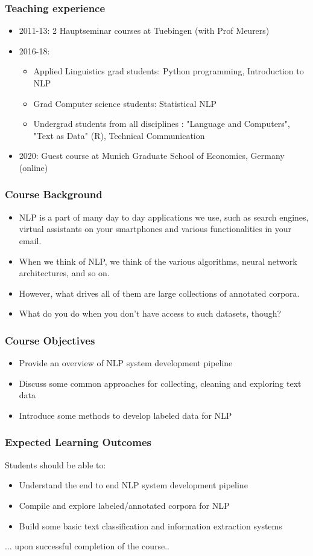 \documentclass{beamer}
\begin{document}
\begin{frame}
\frametitle{Teaching experience}
\begin{itemize}
\item 2011-13: 2 Hauptseminar courses at Tuebingen (with Prof Meurers)
\item 2016-18:
\begin{itemize}
\item Applied Linguistics grad students: Python programming, Introduction to NLP
\item Grad Computer science students: Statistical NLP
\item Undergrad students from all disciplines : "Language and Computers", "Text as Data" (R), Technical Communication 
\end{itemize}
\item 2020: Guest course at Munich Graduate School of Economics, Germany (online)
\end{itemize}
\end{frame}

\begin{frame}
\frametitle{Course Background}
\begin{itemize}
\item NLP is a part of many day to day applications we use, such as search engines, virtual assistants on your smartphones and various functionalities in your email.
\pause \item When we think of NLP, we think of the various algorithms, neural network architectures, and so on. \pause
\item However, what drives all of them are large collections of annotated corpora. \pause
\item What do you do when you don't have access to such datasets, though? 
\end{itemize}
\end{frame}

\begin{frame}
\frametitle{Course Objectives}
\begin{itemize}
\item Provide an overview of NLP system development pipeline
\item Discuss some common approaches for collecting, cleaning and exploring text data
\item Introduce some methods to develop labeled data for NLP 
\end{itemize}
\end{frame}

\begin{frame}
\frametitle{Expected Learning Outcomes}
Students should be able to: 
\begin{itemize}
\item Understand the end to end NLP system development pipeline
\item Compile and explore labeled/annotated corpora for NLP
\item Build some basic text classification and information extraction systems
\end{itemize}
... upon successful completion of the course..
\end{frame}
\end{document}
